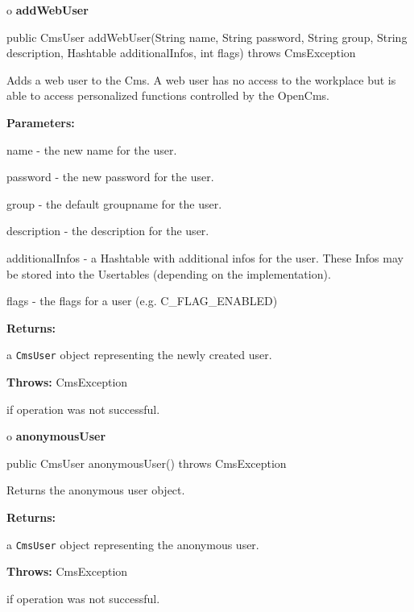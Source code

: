 o {\bf addWebUser}

\begin{PRE}
 public CmsUser addWebUser(String name,
                           String password,
                           String group,
                           String description,
                           Hashtable additionalInfos,
                           int flags) throws CmsException
\end{PRE}

\begin{description}
\htmlDD Adds a web user to the Cms. \htmlBR
A web user has no access to the workplace but is able to access personalized
functions controlled by the OpenCms.

\begin{description}
\item {\bf Parameters:}

name - the new name for the user.

password - the new password for the user.

group - the default groupname for the user.

description - the description for the user.

additionalInfos - a Hashtable with additional infos for the user. These Infos
may be stored into the Usertables (depending on the implementation).

flags - the flags for a user (e.g. C\_FLAG\_ENABLED)
\item {\bf Returns:}

a {\tt CmsUser} object representing the newly created user.
\item {\bf Throws:} CmsException

if operation was not successful.
\end{description}

\end{description}

o {\bf anonymousUser}

\begin{PRE}
 public CmsUser anonymousUser() throws CmsException
\end{PRE}

\begin{description}
\htmlDD Returns the anonymous user object.

\begin{description}
\item {\bf Returns:}

a {\tt CmsUser} object representing the anonymous user.
\item {\bf Throws:} CmsException

if operation was not successful.
\end{description}

\end{description}

